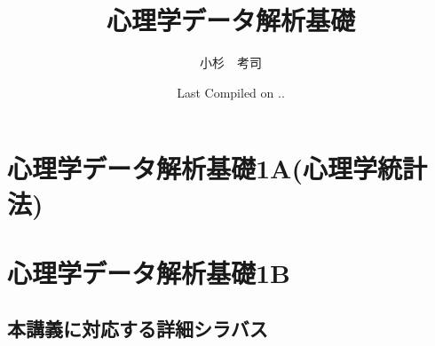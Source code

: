 \documentclass[dvipsnames]{ltjsbook}
\begin{document}

\VerbatimFootnotes
\title{心理学データ解析基礎}
\author{小杉　考司}
\date{Last Compiled on \number\year .\number\month .\number\day}
\maketitle
\setcounter{tocdepth}{1}



\tableofcontents

\linenumbers
\part{心理学データ解析基礎1A(心理学統計法)}















\part{心理学データ解析基礎1B}
















\appendix

\chapter{本講義に対応する詳細シラバス}






























\nolinenumbers




\printindex
\end{document}
